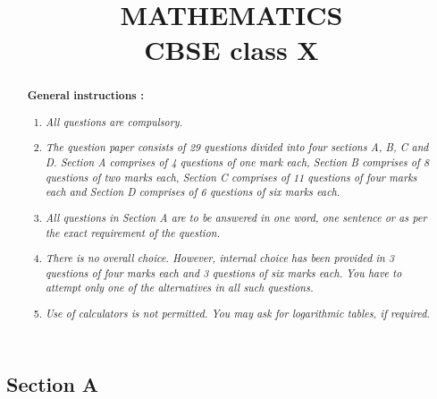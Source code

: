 \documentclass[journal,12pt,twocolumn]{IEEEtran}
\begin{document}
\let\StandardTheFigure\thefigure
\let\vec\mathbf
\renewcommand{\thefigure}{\theproblem}



\def\putbox#1#2#3{\makebox[0in][l]{\makebox[#1][l]{}\raisebox{\baselineskip}[0in][0in]{\raisebox{#2}[0in][0in]{#3}}}}
     \def\rightbox#1{\makebox[0in][r]{#1}}
     \def\centbox#1{\makebox[0in]{#1}}
     \def\topbox#1{\raisebox{-\baselineskip}[0in][0in]{#1}}
     \def\midbox#1{\raisebox{-0.5\baselineskip}[0in][0in]{#1}}

\title{MATHEMATICS\\ \normalsize CBSE class X}
\maketitle
\begin{abstract}

     \textbf{General instructions : }
     
     \begin{enumerate}
     \item \textit{All questions are compulsory.}
     
     \item \textit{The question paper consists of 29 questions divided into four sections A, B, C and D. Section A comprises of 4 questions of one mark each, Section B comprises of 8 questions of two marks each, Section C comprises of 11 questions of four marks each and Section D comprises of 6 questions of six marks each.}
     
     \item \textit{All questions in Section A are to be answered in one word, one sentence or as per the exact requirement of the question.}
     
     \item \textit{There is no overall choice. However, internal choice has been provided in 3 questions of four marks each and 3 questions of six marks each. You have to attempt only one of the alternatives in all such questions.}
     
     \item \textit{Use of calculators is not permitted. You may ask for logarithmic tables, if required.}
     \end{enumerate}
     
\end{abstract}
\begin{center}
     \section*{Section A}
     \end{center}
     
\end{document}

